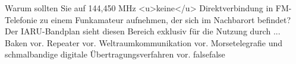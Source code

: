     {Warum sollten Sie auf 144,450 MHz <u>keine</u> Direktverbindung in FM-Telefonie zu einem Funkamateur aufnehmen, der sich im Nachbarort befindet? Der IARU-Bandplan sieht diesen Bereich exklusiv für die Nutzung durch ...}
    {Baken vor.}
    {Repeater vor.}
    {Weltraumkommunikation vor.}
    {Morsetelegrafie und schmalbandige digitale Übertragungsverfahren vor.}
    {false}{false}